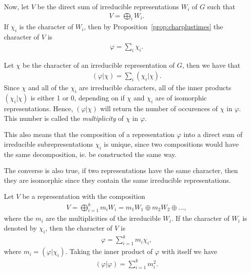 Now, let $V$ be the direct sum of irreducible representations $W_i$ of $G$ such that
\begin{align*}
	V = \bigoplus_i W_i.
\end{align*}
If $\chi_i$ is the character of $W_i$, then by Proposition~\ref{prop:charplustimes} the character of $V$ is
\begin{align*}
	\varphi = \sum_i \chi_i.
\end{align*}

Let $\chi$ be the character of an irreducible representation of $G$, then we have that
\begin{align*}
	(\varphi|\chi) = \sum_i (\chi_i|\chi).
\end{align*}
Since $\chi$ and all of the $\chi_i$ are irreducible characters, all of the inner products $(\chi_i|\chi)$ is either 1 or 0, depending on if $\chi$ and $\chi_i$ are of isomorphic representations. Hence, $(\varphi|\chi)$ will return the number of occurences of $\chi$ in $\varphi$. This number is called the \textit{multiplicity} of $\chi$ in $\varphi$.

\begin{remark}
	This also means that the composition of a representation $\varphi$ into a direct sum of irreducible subrepresentations $\chi_i$ is unique, since two compositions would have the same decomposition, ie. be constructed the same way.
\end{remark}

\begin{remark}
	The converse is also true, if two representations have the same character, then they are isomorphic since they contain the same irreducible representations.
\end{remark}

\begin{note}
	Let $V$ be a representation with the composition 
	\begin{align*}
		V = \bigoplus_{i=1}^k m_i W_i = m_1W_1 \oplus m_2W_2 \oplus \dots,
	\end{align*}
	where the $m_i$ are the multiplicities of the irreducible $W_i$. If the character of $W_i$ is denoted by $\chi_i$, then the character of $V$ is
	\begin{align*}
		\varphi = \sum_{i=1}^k m_i \chi_i,
	\end{align*}
	where $m_i = (\varphi|\chi_i)$.	Taking the inner product of $\varphi$ with itself we have
	\begin{align}\label{eq:innerprodself}
		(\varphi|\varphi) = \sum_{i=1}^k m_i^2.
	\end{align}
\end{note}

